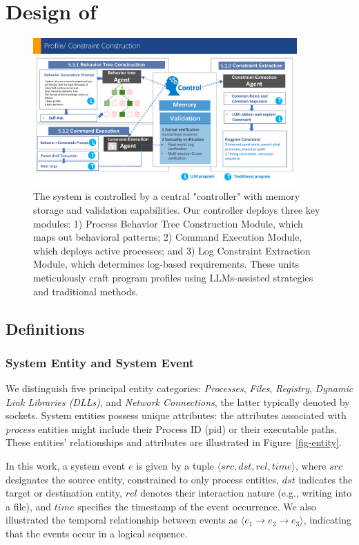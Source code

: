 \section{Design of \tool}

\begin{figure}[h]
    \centering
      \includegraphics[width=0.9\textwidth]{figs/prompt.pdf}
    \caption{The system is controlled by a central "controller" with memory storage and validation capabilities. Our controller deploys three key modules: 1) Process Behavior Tree Construction Module, which maps out behavioral patterns; 2) Command Execution Module, which deploys active processes; and 3) Log Constraint Extraction Module, which determines log-based requirements. These units meticulously craft program profiles using LLMs-assisted strategies and traditional methods.}
    \label{fig-framework-prompt}
    \end{figure}

\subsection{Definitions}

\subsubsection{System Entity and System Event}
We distinguish five principal entity categories: \textit{Processes}, \textit{Files}, \textit{Registry}, \textit{Dynamic Link Libraries (DLLs)}, and \textit{Network Connections}, the latter typically denoted by sockets. System entities possess unique attributes: the attributes associated with \textit{process} entities might include their Process ID (pid) or their executable paths. These entities' relationships and attributes are illustrated in Figure~\ref{fig-entity}. 

In this work, a system event $e$ is given by a tuple $\langle src, dst, rel, time\rangle$, where $src$ designates the source entity, constrained to only process entities, $dst$ indicates the target or destination entity, $rel$ denotes their interaction nature (e.g., writing into a file), and $time$ specifies the timestamp of the event occurrence.
We also illustrated the temporal relationship between events as $\langle e_1 \to e_2 \to e_3 \rangle$, indicating that the events occur in a logical sequence. 



